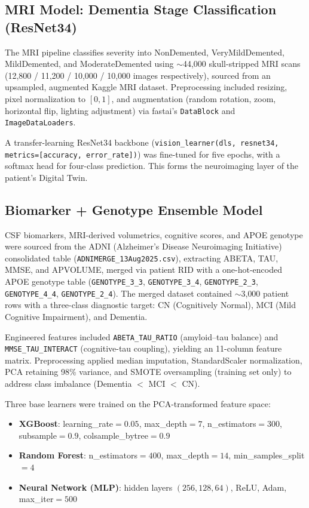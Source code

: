 \documentclass[conference]{IEEEtran}
\begin{document}
\subsection{MRI Model: Dementia Stage Classification (ResNet34)}
The MRI pipeline classifies severity into NonDemented, VeryMildDemented, MildDemented, and ModerateDemented using $\sim$44{,}000 skull-stripped MRI scans (12{,}800 / 11{,}200 / 10{,}000 / 10{,}000 images respectively), sourced from an upsampled, augmented Kaggle MRI dataset. Preprocessing included resizing, pixel normalization to $[0,1]$, and augmentation (random rotation, zoom, horizontal flip, lighting adjustment) via fastai's \texttt{DataBlock} and \texttt{ImageDataLoaders}.

A transfer-learning ResNet34 backbone (\texttt{vision\_learner(dls, resnet34, metrics=[accuracy, error\_rate])}) was fine-tuned for five epochs, with a softmax head for four-class prediction. This forms the neuroimaging layer of the patient's Digital Twin.

\subsection{Biomarker + Genotype Ensemble Model}
CSF biomarkers, MRI-derived volumetrics, cognitive scores, and APOE genotype were sourced from the ADNI (Alzheimer's Disease Neuroimaging Initiative) consolidated table (\texttt{ADNIMERGE\_13Aug2025.csv}), extracting ABETA, TAU, MMSE, and APVOLUME, merged via patient RID with a one-hot-encoded APOE genotype table (\texttt{GENOTYPE\_3\_3}, \texttt{GENOTYPE\_3\_4}, \texttt{GENOTYPE\_2\_3}, \texttt{GENOTYPE\_4\_4}, \texttt{GENOTYPE\_2\_4}). The merged dataset contained $\sim$3{,}000 patient rows with a three-class diagnostic target: CN (Cognitively Normal), MCI (Mild Cognitive Impairment), and Dementia.

Engineered features included \texttt{ABETA\_TAU\_RATIO} (amyloid--tau balance) and \texttt{MMSE\_TAU\_INTERACT} (cognitive-tau coupling), yielding an 11-column feature matrix. Preprocessing applied median imputation, StandardScaler normalization, PCA retaining 98\% variance, and SMOTE oversampling (training set only) to address class imbalance (Dementia $<$ MCI $<$ CN).

Three base learners were trained on the PCA-transformed feature space:
\begin{itemize}
    \item \textbf{XGBoost}: learning\_rate$=0.05$, max\_depth$=7$, n\_estimators$=300$, subsample$=0.9$, colsample\_bytree$=0.9$
    \item \textbf{Random Forest}: n\_estimators$=400$, max\_depth$=14$, min\_samples\_split$=4$
    \item \textbf{Neural Network (MLP)}: hidden layers $(256,128,64)$, ReLU, Adam, max\_iter$=500$
\end{itemize}
\end{document}
